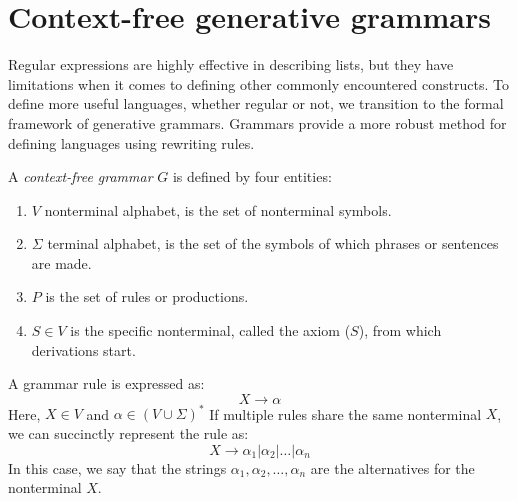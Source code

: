 \section{Context-free generative grammars}

Regular expressions are highly effective in describing lists, but they have limitations when it comes to defining other commonly encountered constructs. 
To define more useful languages, whether regular or not, we transition to the formal framework of generative grammars. 
Grammars provide a more robust method for defining languages using rewriting rules.
\begin{definition}
    A \emph{context-free grammar} $G$ is defined by four entities: 
    \begin{enumerate}
        \item $V$ nonterminal alphabet, is the set of nonterminal symbols.
        \item $\Sigma$ terminal alphabet, is the set of the symbols of which phrases or sentences are made.
        \item $P$ is the set of rules or productions.
        \item $S \in V$ is the specific nonterminal, called the axiom ($S$), from which derivations start. 
    \end{enumerate}
\end{definition}

A grammar rule is expressed as:
\[X \rightarrow \alpha\]
Here, $X \in V$ and $\alpha \in (V \cup \Sigma)^{*}$
If multiple rules share the same nonterminal $X$, we can succinctly represent the rule as:
\[X \rightarrow \alpha_1 | \alpha_2 | \dots | \alpha_n\]
In this case, we say that the strings $\alpha_1,\alpha_2,\dots,\alpha_n$  are the alternatives for the nonterminal $X$. 

